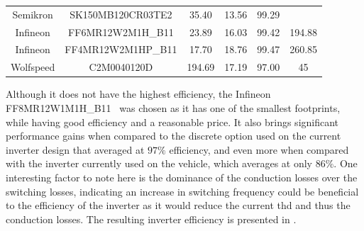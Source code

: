 \begin{table}[]
{\begin{tabular}{cccccc}
		Semikron              & SK150MB120CR03TE2          & 35.40         & 13.56  & 99.29      &                \\
		Infineon              & FF6MR12W2M1H\_B11          & 23.89         & 16.03  & 99.42      & 194.88         \\
		Infineon              & FF4MR12W2M1HP\_B11         & 17.70         & 18.76  & 99.47      & 260.85         \\ \midrule
		Wolfspeed             & C2M0040120D                & 194.69        & 17.19  & 97.00      & 45             \\ \bottomrule
	\end{tabular}
	}
\end{table}

Although it does not have the highest efficiency, the Infineon FF8MR12W1M1H\_B11~\cite{Infineon:Module_Datasheet:2023} was chosen as it has one of the smallest footprints, while having good efficiency and a reasonable price.  It also brings significant performance gains when compared to the discrete option used on the current inverter design that averaged at $97\%$ efficiency, and even more when compared with the inverter currently used on the vehicle, which averages at only $86\%$. One interesting factor to note here is the dominance of the conduction losses over the switching losses, indicating an increase in switching frequency could be beneficial to the efficiency of the inverter as it would reduce the current \gls{thd} and thus the conduction losses. The resulting inverter efficiency is presented in .



